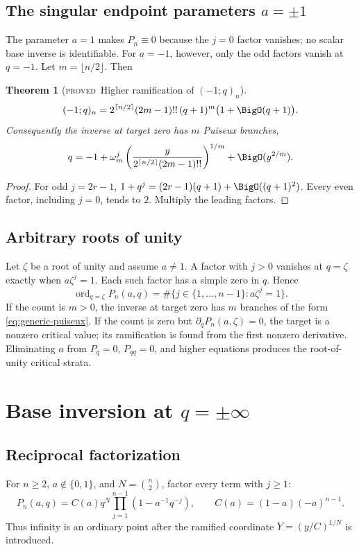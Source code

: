 \documentclass[11pt,letterpaper,oneside,openany]{book}
\newtheorem{theorem}{Theorem}[chapter]
\theoremstyle{definition}
\theoremstyle{remark}
\newcommand{\ord}{\operatorname{ord}}
\newcommand{\statusproved}{\textcolor{provedgreen}{\textsc{proved}}}
\begin{document}
\section{The singular endpoint parameters \(a=\pm1\)}
The parameter \(a=1\) makes \(P_n\equiv0\) because the \(j=0\) factor vanishes;
no scalar base inverse is identifiable.  For \(a=-1\), however, only the odd
factors vanish at \(q=-1\).  Let \(m=\lfloor n/2\rfloor\).  Then
\begin{theorem}[\statusproved\ Higher ramification of \((-1;q)_n\)]
\begin{equation}
 (-1;q)_n=
 2^{\lceil n/2\rceil}(2m-1)!!\,(q+1)^m
 \bigl(1+\BigO(q+1)\bigr).
 \label{eq:minus-one-a-minus-one}
\end{equation}
Consequently the inverse at target zero has \(m\) Puiseux branches,
\[
 q=-1+\omega_m^j
 \left(\frac{y}{2^{\lceil n/2\rceil}(2m-1)!!}\right)^{1/m}
 +\BigO(y^{2/m}).
\]
\end{theorem}
\begin{proof}
For odd \(j=2r-1\),
\(1+q^j=(2r-1)(q+1)+\BigO((q+1)^2)\).  Every even factor, including \(j=0\),
tends to \(2\).  Multiply the leading factors.
\end{proof}

\section{Arbitrary roots of unity}
Let \(\zeta\) be a root of unity and assume \(a\ne1\).  A factor with \(j>0\)
vanishes at \(q=\zeta\) exactly when \(a\zeta^j=1\).  Each such factor has a
simple zero in \(q\).  Hence
\begin{equation}
 \ord_{q=\zeta}P_n(a,q)
 =\#\{j\in\{1,\ldots,n-1\}:a\zeta^j=1\}.
 \label{eq:p-root-unity-multiplicity}
\end{equation}
If the count is \(m>0\), the inverse at target zero has \(m\) branches of the
form \cref{eq:generic-puiseux}.  If the count is zero but
\(\partial_qP_n(a,\zeta)=0\), the target is a nonzero critical value; its
ramification is found from the first nonzero derivative.  Eliminating \(a\)
from \(P_q=0\), \(P_{qq}=0\), and higher equations produces the root-of-unity
critical strata.

\chapter{Base inversion at \(q=\pm\infty\)}

\section{Reciprocal factorization}
For \(n\ge2\), \(a\notin\{0,1\}\), and \(N=\binom n2\), factor every term with
\(j\ge1\):
\begin{equation}
 P_n(a,q)=C(a)q^N
 \prod_{j=1}^{n-1}(1-a^{-1}q^{-j}),
 \qquad
 C(a)=(1-a)(-a)^{n-1}.
 \label{eq:p-reciprocal-factorization}
\end{equation}
Thus infinity is an ordinary point after the ramified coordinate
\(Y=(y/C)^{1/N}\) is introduced.
\end{document}
